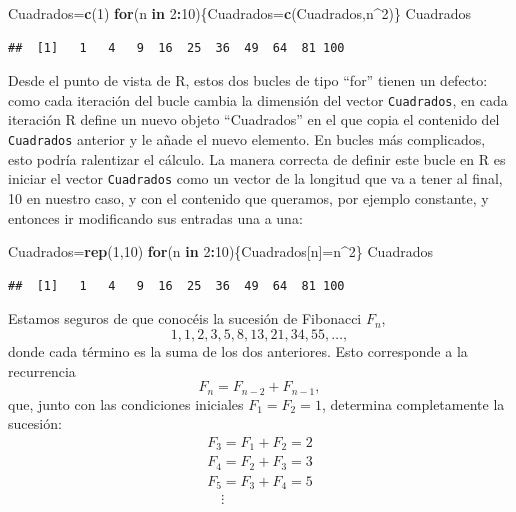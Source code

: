 \documentclass[]{book}
\newenvironment{Shaded}{\begin{snugshade}}{\end{snugshade}}
\newcommand{\ControlFlowTok}[1]{\textcolor[rgb]{0.13,0.29,0.53}{\textbf{#1}}}
\newcommand{\DecValTok}[1]{\textcolor[rgb]{0.00,0.00,0.81}{#1}}
\newcommand{\KeywordTok}[1]{\textcolor[rgb]{0.13,0.29,0.53}{\textbf{#1}}}
\newcommand{\NormalTok}[1]{#1}
\newcommand{\OperatorTok}[1]{\textcolor[rgb]{0.81,0.36,0.00}{\textbf{#1}}}
\theoremstyle{definition}
\theoremstyle{definition}
\theoremstyle{definition}
\theoremstyle{remark}
\let\BeginKnitrBlock\begin \let\EndKnitrBlock\end
\begin{document}
\begin{Shaded}
\begin{Highlighting}[]
\NormalTok{Cuadrados=}\KeywordTok{c}\NormalTok{(}\DecValTok{1}\NormalTok{)  }
\ControlFlowTok{for}\NormalTok{(n }\ControlFlowTok{in} \DecValTok{2}\OperatorTok{:}\DecValTok{10}\NormalTok{)\{Cuadrados=}\KeywordTok{c}\NormalTok{(Cuadrados,n}\OperatorTok{^}\DecValTok{2}\NormalTok{)\}}
\NormalTok{Cuadrados}
\end{Highlighting}
\end{Shaded}

\begin{verbatim}
##  [1]   1   4   9  16  25  36  49  64  81 100
\end{verbatim}

Desde el punto de vista de R, estos dos bucles de tipo ``for'' tienen un defecto: como cada iteración del bucle cambia la dimensión del vector \texttt{Cuadrados}, en cada iteración R define un nuevo objeto ``Cuadrados'' en el que copia el contenido del \texttt{Cuadrados} anterior y le añade el nuevo elemento. En bucles más complicados, esto podría ralentizar el cálculo. La manera correcta de definir este bucle en R es iniciar el vector \texttt{Cuadrados} como un vector de la longitud que va a tener al final, 10 en nuestro caso, y con el contenido que queramos, por ejemplo constante, y entonces ir modificando sus entradas una a una:

\begin{Shaded}
\begin{Highlighting}[]
\NormalTok{Cuadrados=}\KeywordTok{rep}\NormalTok{(}\DecValTok{1}\NormalTok{,}\DecValTok{10}\NormalTok{)  }
\ControlFlowTok{for}\NormalTok{(n }\ControlFlowTok{in} \DecValTok{2}\OperatorTok{:}\DecValTok{10}\NormalTok{)\{Cuadrados[n]=n}\OperatorTok{^}\DecValTok{2}\NormalTok{\}}
\NormalTok{Cuadrados}
\end{Highlighting}
\end{Shaded}

\begin{verbatim}
##  [1]   1   4   9  16  25  36  49  64  81 100
\end{verbatim}

\BeginKnitrBlock{example}
\protect\hypertarget{exm:fib1}{}{\label{exm:fib1} }Estamos seguros de que conocéis la sucesión de Fibonacci \(F_n\),
\[
1, 1, 2, 3, 5, 8, 13, 21, 34, 55, \ldots,
\]
donde cada término es la suma de los dos anteriores. Esto corresponde a la recurrencia
\[
F_{n}=F_{n-2}+F_{n-1},
\]
que, junto con las condiciones iniciales \(F_1=F_2=1\), determina completamente la sucesión:
\[
\begin{array}{l}
F_3=F_1+F_2=2\\
F_4=F_2+F_3=3\\
F_5=F_3+F_4=5\\
\quad\vdots
\end{array}
\]
\EndKnitrBlock{example}
\end{document}
